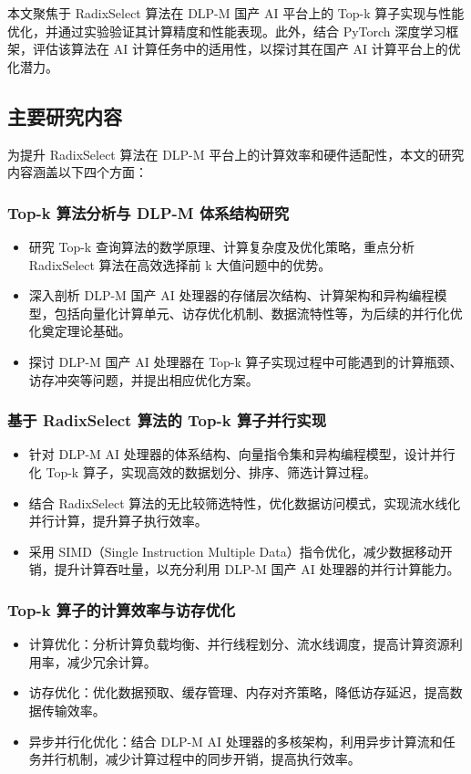 本文聚焦于 RadixSelect 算法在 DLP-M 国产 AI 平台上的 Top-k 算子实现与性能优化，并通过实验验证其计算精度和性能表现。此外，结合 PyTorch 深度学习框架，评估该算法在 AI 计算任务中的适用性，以探讨其在国产 AI 计算平台上的优化潜力。

\subsection{主要研究内容}

为提升 RadixSelect 算法在 DLP-M 平台上的计算效率和硬件适配性，本文的研究内容涵盖以下四个方面：

\subsubsection{Top-k 算法分析与 DLP-M 体系结构研究}
\begin{itemize}
    \item 研究 Top-k 查询算法的数学原理、计算复杂度及优化策略，重点分析 RadixSelect 算法在高效选择前 k 大值问题中的优势。
    \item 深入剖析 DLP-M 国产 AI 处理器的存储层次结构、计算架构和异构编程模型，包括向量化计算单元、访存优化机制、数据流特性等，为后续的并行化优化奠定理论基础。
    \item 探讨 DLP-M 国产 AI 处理器在 Top-k 算子实现过程中可能遇到的计算瓶颈、访存冲突等问题，并提出相应优化方案。
\end{itemize}

\subsubsection{基于 RadixSelect 算法的 Top-k 算子并行实现}
\begin{itemize}
    \item 针对 DLP-M AI 处理器的体系结构、向量指令集和异构编程模型，设计并行化 Top-k 算子，实现高效的数据划分、排序、筛选计算过程。
    \item 结合 RadixSelect 算法的无比较筛选特性，优化数据访问模式，实现流水线化并行计算，提升算子执行效率。
    \item 采用 SIMD（Single Instruction Multiple Data）指令优化，减少数据移动开销，提升计算吞吐量，以充分利用 DLP-M 国产 AI 处理器的并行计算能力。
\end{itemize}

\subsubsection{Top-k 算子的计算效率与访存优化}
\begin{itemize}
    \item 计算优化：分析计算负载均衡、并行线程划分、流水线调度，提高计算资源利用率，减少冗余计算。
    \item 访存优化：优化数据预取、缓存管理、内存对齐策略，降低访存延迟，提高数据传输效率。
    \item 异步并行化优化：结合 DLP-M AI 处理器的多核架构，利用异步计算流和任务并行机制，减少计算过程中的同步开销，提高执行效率。
\end{itemize}

